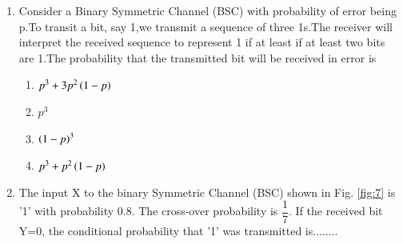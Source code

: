 \renewcommand{\theequation}{\theenumi}
\renewcommand{\thefigure}{\theenumi}
\renewcommand{\thetable}{\theenumi}
\begin{enumerate}[label=\thesection.\arabic*.,ref=\thesection.\theenumi]


\item Consider a Binary Symmetric Channel (BSC) with probability of error being p.To transit a bit, say 1,we transmit a sequence of three 1s.The receiver will interpret the received sequence to represent 1 if at least if at least two bits are 1.The probability that the transmitted bit will be received in error is
\begin{enumerate}
\item $p^3 + 3 p^2\left(1-p\right)$ 

\item $p^3$

\item $\left(1-p\right)^3$

\item $p^3+p^2\left(1-p\right)$
\end{enumerate}

%
\solution




\item The input X to the binary Symmetric Channel (BSC) shown in Fig. \ref{fig:7} is '1' with probability 0.8. The cross-over probability is $\dfrac{1}{7}$. If the received bit Y=0, the conditional probability that '1' was transmitted is........\\



\end{enumerate}

